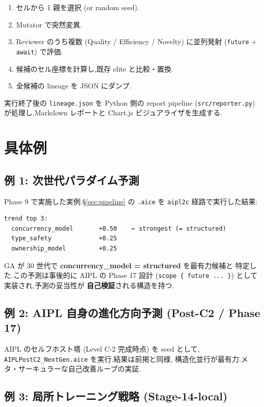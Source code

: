 \documentclass[11pt,a4paper]{article}
\newcommand{\code}[1]{\texttt{\small #1}}
\begin{document}
\begin{enumerate}[leftmargin=*,itemsep=0pt]
  \item セルから 1 親を選択 (or random seed).
  \item Mutator で突然変異.
  \item Reviewer のうち複数 (Quality / Efficiency / Novelty) に並列発射
    (\code{future} + \code{await}) で評価.
  \item 候補のセル座標を計算し,既存 elite と比較・置換.
  \item 全候補の lineage を JSON にダンプ.
\end{enumerate}

実行終了後の \code{lineage.json} を Python 側の report pipeline
(\code{src/reporter.py}) が処理し,Markdown レポートと Chart.js
ビジュアライザを生成する.

\section{具体例}
\label{sec:examples}

\subsection{例 1: 次世代パラダイム予測}

Phase 9 で実施した実例.\S\ref{sec:pipeline} の \code{.aice} を
\code{aipl2c} 経路で実行した結果:

\begin{lstlisting}[language=aipl, basicstyle=\ttfamily\footnotesize]
trend top 3:
  concurrency_model       +0.50    ← strongest (= structured)
  type_safety             +0.25
  ownership_model         +0.25
\end{lstlisting}

GA が 30 世代で \textbf{concurrency\_model = structured} を最有力候補と
特定した.この予測は事後的に AIPL の Phase 17 設計
(\code{scope \{ future ... \}}) として実装され,予測の妥当性が
\textbf{自己検証}される構造を持つ.

\subsection{例 2: AIPL 自身の進化方向予測 (Post-C2 / Phase 17)}

AIPL のセルフホスト塔 (Level C-2 完成時点) を seed として,
\code{AIPLPostC2\_NextGen.aice} を実行.結果は前掲と同様,
構造化並行が最有力.メタ・サーキュラーな自己改善ループの実証.

\subsection{例 3: 局所トレーニング戦略 (Stage-14-local)}
\end{document}
